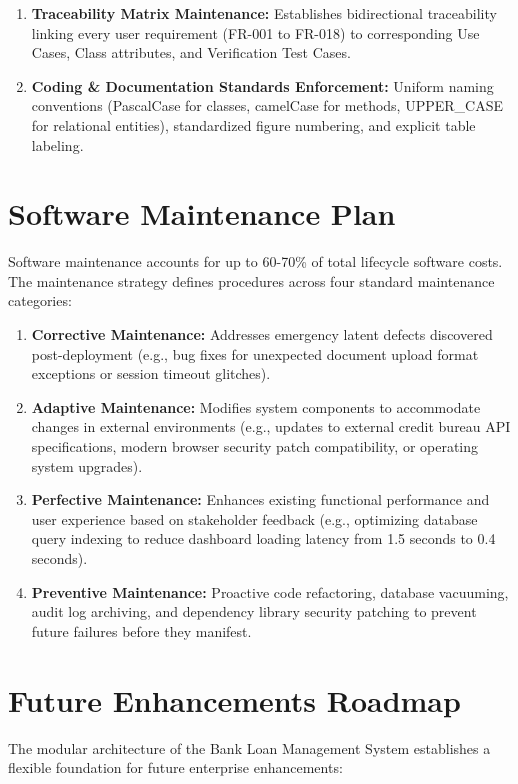 \begin{enumerate}
  \item \textbf{Traceability Matrix Maintenance:} Establishes bidirectional traceability linking every user requirement (FR-001 to FR-018) to corresponding Use Cases, Class attributes, and Verification Test Cases.
  \item \textbf{Coding \& Documentation Standards Enforcement:} Uniform naming conventions (PascalCase for classes, camelCase for methods, UPPER\_CASE for relational entities), standardized figure numbering, and explicit table labeling.
\end{enumerate}

\section{Software Maintenance Plan}

Software maintenance accounts for up to 60-70\% of total lifecycle software costs. The maintenance strategy defines procedures across four standard maintenance categories:

\begin{enumerate}
  \item \textbf{Corrective Maintenance:} Addresses emergency latent defects discovered post-deployment (e.g., bug fixes for unexpected document upload format exceptions or session timeout glitches).
  \item \textbf{Adaptive Maintenance:} Modifies system components to accommodate changes in external environments (e.g., updates to external credit bureau API specifications, modern browser security patch compatibility, or operating system upgrades).
  \item \textbf{Perfective Maintenance:} Enhances existing functional performance and user experience based on stakeholder feedback (e.g., optimizing database query indexing to reduce dashboard loading latency from 1.5 seconds to 0.4 seconds).
  \item \textbf{Preventive Maintenance:} Proactive code refactoring, database vacuuming, audit log archiving, and dependency library security patching to prevent future failures before they manifest.
\end{enumerate}

\section{Future Enhancements Roadmap}

The modular architecture of the Bank Loan Management System establishes a flexible foundation for future enterprise enhancements:


